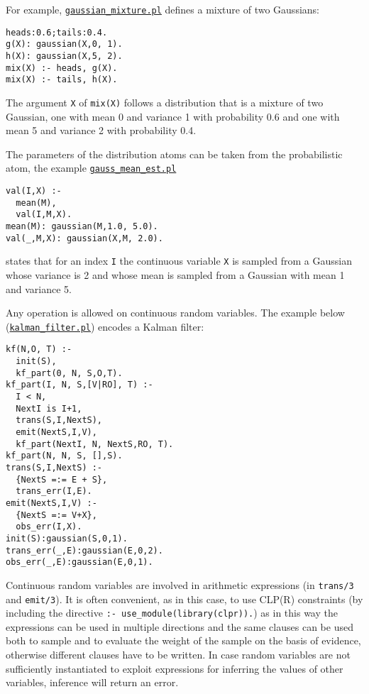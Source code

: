 For example, \href{http://cplint.eu/example/inference/gaussian_mixture.pl}{\texttt{gaussian\_mixture.pl}} defines a mixture of two Gaussians:
\begin{verbatim}
heads:0.6;tails:0.4.
g(X): gaussian(X,0, 1).
h(X): gaussian(X,5, 2).
mix(X) :- heads, g(X).
mix(X) :- tails, h(X).
\end{verbatim}
The argument \verb|X| of
\verb|mix(X)| follows a distribution that is a mixture of two Gaussian,
one with mean 0 and variance 1 with probability 0.6 and one with 
mean 5 and variance 2 with probability 0.4.

The parameters of the distribution atoms can be taken from the probabilistic
atom, the example \href{http://cplint.eu/example/inference/gauss_mean_est.pl}{\texttt{gauss\_mean\_est.pl}}
\begin{verbatim}
val(I,X) :-
  mean(M),
  val(I,M,X).
mean(M): gaussian(M,1.0, 5.0).
val(_,M,X): gaussian(X,M, 2.0).
\end{verbatim}
states that for an index \verb|I| the continuous variable \verb|X| is 
sampled from a Gaussian whose variance is 2 and whose mean is sampled from a Gaussian with mean 1 and
variance 5.

Any operation is allowed on continuous random variables. The example below
(\href{http://cplint.eu/example/inference/kalman_filter.pl}{\texttt{kalman\_filter.pl}}) encodes a Kalman filter:
\begin{verbatim}
kf(N,O, T) :-
  init(S),
  kf_part(0, N, S,O,T).
kf_part(I, N, S,[V|RO], T) :-
  I < N,
  NextI is I+1,
  trans(S,I,NextS),
  emit(NextS,I,V),
  kf_part(NextI, N, NextS,RO, T).
kf_part(N, N, S, [],S).
trans(S,I,NextS) :-
  {NextS =:= E + S},
  trans_err(I,E).
emit(NextS,I,V) :-
  {NextS =:= V+X},
  obs_err(I,X).
init(S):gaussian(S,0,1).
trans_err(_,E):gaussian(E,0,2).
obs_err(_,E):gaussian(E,0,1).
\end{verbatim}
Continuous random variables are involved
in arithmetic expressions (in \verb|trans/3| and \verb|emit/3|). It
is often convenient, as in this case, to use CLP(R) constraints (by
including the directive \verb|:- use_module(library(clpr)).|) as 
in this way the expressions can be used in multiple directions and 
the same clauses can be used both to sample and to evaluate the weight of the sample on the basis
of evidence,
otherwise different clauses have to be written.
In case random variables are not sufficiently instantiated to 
exploit expressions for inferring the values of other variables, 
inference will return an error.


